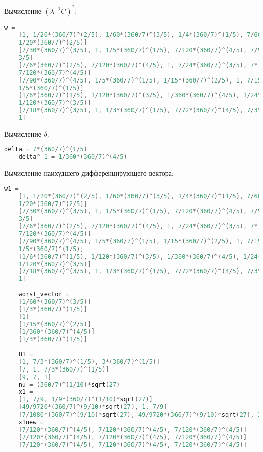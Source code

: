 \documentclass[specialist,
	substylefile = spbu_report.rtx,
	subf,href,colorlinks=true, 12pt]{disser}
\begin{document}
Вычисление $(\lambda^{-1}C)^*$:
\begin{lstlisting}[language=c++,basicstyle=\scriptsize\ttfamily]
	w = 
	[1, 1/20*(360/7)^(2/5), 1/60*(360/7)^(3/5), 1/4*(360/7)^(1/5), 7/60*(360/7)^(4/5), 
	1/20*(360/7)^(2/5)]
	[7/30*(360/7)^(3/5), 1, 1/5*(360/7)^(1/5), 7/120*(360/7)^(4/5), 7/5*(360/7)^(2/5), 
	3/5]
	[7/6*(360/7)^(2/5), 7/120*(360/7)^(4/5), 1, 7/24*(360/7)^(3/5), 7*(360/7)^(1/5), 
	7/120*(360/7)^(4/5)]
	[7/90*(360/7)^(4/5), 1/5*(360/7)^(1/5), 1/15*(360/7)^(2/5), 1, 7/15*(360/7)^(3/5), 
	1/5*(360/7)^(1/5)]
	[1/6*(360/7)^(1/5), 1/120*(360/7)^(3/5), 1/360*(360/7)^(4/5), 1/24*(360/7)^(2/5), 1, 
	1/120*(360/7)^(3/5)]
	[7/18*(360/7)^(3/5), 1, 1/3*(360/7)^(1/5), 7/72*(360/7)^(4/5), 7/3*(360/7)^(2/5), 
	1]
\end{lstlisting}

Вычисление $\delta$:
\begin{lstlisting}[language=c++,basicstyle=\footnotesize\ttfamily]
	delta = 7*(360/7)^(1/5)
	delta^-1 = 1/360*(360/7)^(4/5)
\end{lstlisting}
Вычисление наихудшего дифференцирующего вектора:
\begin{lstlisting}[language=c++,basicstyle=\scriptsize\ttfamily]
	w1 = 
	[1, 1/20*(360/7)^(2/5), 1/60*(360/7)^(3/5), 1/4*(360/7)^(1/5), 7/60*(360/7)^(4/5), 
	1/20*(360/7)^(2/5)]
	[7/30*(360/7)^(3/5), 1, 1/5*(360/7)^(1/5), 7/120*(360/7)^(4/5), 7/5*(360/7)^(2/5), 
	3/5]
	[7/6*(360/7)^(2/5), 7/120*(360/7)^(4/5), 1, 7/24*(360/7)^(3/5), 7*(360/7)^(1/5), 
	7/120*(360/7)^(4/5)]
	[7/90*(360/7)^(4/5), 1/5*(360/7)^(1/5), 1/15*(360/7)^(2/5), 1, 7/15*(360/7)^(3/5), 
	1/5*(360/7)^(1/5)]
	[1/6*(360/7)^(1/5), 1/120*(360/7)^(3/5), 1/360*(360/7)^(4/5), 1/24*(360/7)^(2/5), 1, 
	1/120*(360/7)^(3/5)]
	[7/18*(360/7)^(3/5), 1, 1/3*(360/7)^(1/5), 7/72*(360/7)^(4/5), 7/3*(360/7)^(2/5), 
	1]
	
	worst_vector = 
	[1/60*(360/7)^(3/5)]
	[1/3*(360/7)^(1/5)]
	[1]
	[1/15*(360/7)^(2/5)]
	[1/360*(360/7)^(4/5)]
	[1/3*(360/7)^(1/5)]
	
	B1 = 
	[1, 7/3*(360/7)^(1/5), 3*(360/7)^(1/5)]
	[7, 1, 7/3*(360/7)^(1/5)]
	[9, 7, 1]
	nu = (360/7)^(1/10)*sqrt(27)
	x1 = 
	[1, 7/9, 1/9*(360/7)^(1/10)*sqrt(27)]
	[49/9720*(360/7)^(9/10)*sqrt(27), 1, 7/9]
	[7/1080*(360/7)^(9/10)*sqrt(27), 49/9720*(360/7)^(9/10)*sqrt(27), 1]
	x1new = 
	[7/120*(360/7)^(4/5), 7/120*(360/7)^(4/5), 7/120*(360/7)^(4/5)]
	[7/120*(360/7)^(4/5), 7/120*(360/7)^(4/5), 7/120*(360/7)^(4/5)]
	[7/120*(360/7)^(4/5), 7/120*(360/7)^(4/5), 7/120*(360/7)^(4/5)]
\end{lstlisting}
\end{document}
